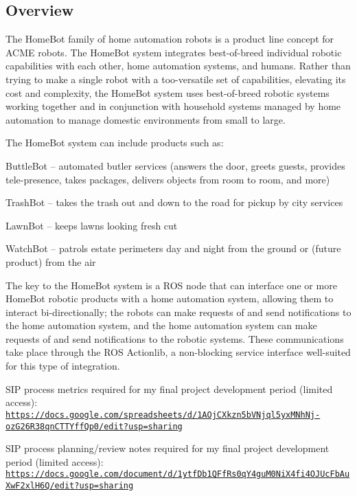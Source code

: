 \subsection*{Overview}

The Home\-Bot family of home automation robots is a product line concept for A\-C\-M\-E robots. The Home\-Bot system integrates best-\/of-\/breed individual robotic capabilities with each other, home automation systems, and humans. Rather than trying to make a single robot with a too-\/versatile set of capabilities, elevating its cost and complexity, the Home\-Bot system uses best-\/of-\/breed robotic systems working together and in conjunction with household systems managed by home automation to manage domestic environments from small to large.

The Home\-Bot system can include products such as\-:


\begin{DoxyItemize}
\item Buttle\-Bot – automated butler services (answers the door, greets guests, provides tele-\/presence, takes packages, delivers objects from room to room, and more)
\item Trash\-Bot – takes the trash out and down to the road for pickup by city services
\item Lawn\-Bot – keeps lawns looking fresh cut
\item Watch\-Bot – patrols estate perimeters day and night from the ground or (future product) from the air
\end{DoxyItemize}

The key to the Home\-Bot system is a R\-O\-S node that can interface one or more Home\-Bot robotic products with a home automation system, allowing them to interact bi-\/directionally; the robots can make requests of and send notifications to the home automation system, and the home automation system can make requests of and send notifications to the robotic systems. These communications take place through the R\-O\-S Actionlib, a non-\/blocking service interface well-\/suited for this type of integration.


\begin{DoxyItemize}
\item S\-I\-P process metrics required for my final project development period (limited access)\-: \href{https://docs.google.com/spreadsheets/d/1AOjCXkzn5bVNjql5yxMNhNj-ozG26R38qnCTTYffQp0/edit?usp=sharing}{\tt https\-://docs.\-google.\-com/spreadsheets/d/1\-A\-Oj\-C\-Xkzn5b\-V\-Njql5yx\-M\-Nh\-Nj-\/oz\-G26\-R38qn\-C\-T\-T\-Yff\-Qp0/edit?usp=sharing}
\item S\-I\-P process planning/review notes required for my final project development period (limited access)\-: \href{https://docs.google.com/document/d/1ytfDb1QFfRs0qY4guM0NiX4fi4OJUcFbAuXwF2xlH6Q/edit?usp=sharing}{\tt https\-://docs.\-google.\-com/document/d/1ytf\-Db1\-Q\-Ff\-Rs0q\-Y4gu\-M0\-Ni\-X4fi4\-O\-J\-Uc\-Fb\-Au\-Xw\-F2xl\-H6\-Q/edit?usp=sharing}
\end{DoxyItemize}

